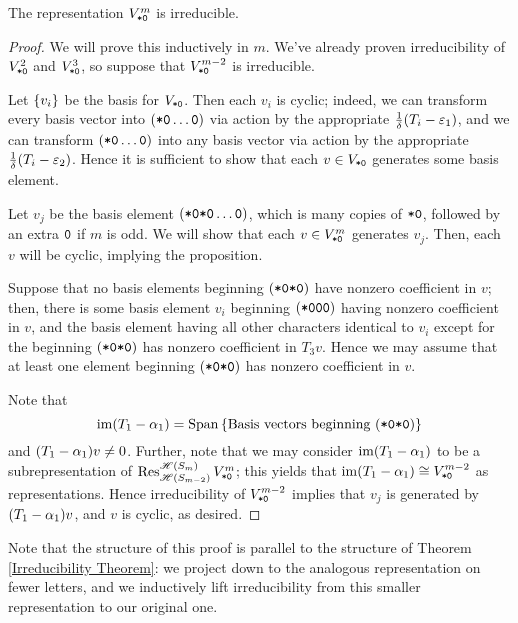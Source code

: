 \documentclass{amsart}
\begin{document}
\begin{proposition}\label{Fib irreducibility}
  The representation \emph{$V^m_{\texttt{*}\texttt{0}}$} is irreducible.
\end{proposition}
\begin{proof}
  We will prove this inductively in $m$.
  We've already proven irreducibility of $V^2_{\texttt{*}\texttt{0}}$ and $V^3_{\texttt{*}\texttt{0}}$, so suppose that $V^{m-2}_{\texttt{*}\texttt{0}}$ is irreducible.
  
  Let $\left\{ v_i \right\}$ be the basis for $V_{\texttt{*}\texttt{0}}$.
  Then each $v_i$ is cyclic; indeed, we can transform every basis vector into $(\texttt{*}\texttt{0} \dots \texttt{0})$ via action by the appropriate $\frac{1}{\delta}(T_i - \varepsilon_1)$, and we can transform $(\texttt{*}\texttt{0} \dots \texttt{0})$ into any basis vector via action by the appropriate $\frac{1}{\delta}(T_i - \varepsilon_2)$.
  Hence it is sufficient to show that each $v \in V_{\texttt{*}\texttt{0}}$ generates some basis element.

  Let $v_j$ be the basis element $(\texttt{*}\texttt{0}\texttt{*}\texttt{0}\dots \texttt{0})$, which is many copies of $\texttt{*}\texttt{0}$, followed by an extra $\texttt{0}$ if $m$ is odd.
  We will show that each $v \in V^m_{\texttt{*}\texttt{0}}$ generates $v_j$.
  Then, each $v$ will be cyclic, implying the proposition.

  Suppose that no basis elements beginning $(\texttt{*}\texttt{0}\texttt{*}\texttt{0})$ have nonzero coefficient in $v$;
  then, there is some basis element $v_i$ beginning $(\texttt{*}\texttt{0}\texttt{0}\texttt{0})$ having nonzero coefficient in $v$, and the basis element having all other characters identical to $v_i$ except for the beginning $(\texttt{*}\texttt{0}\texttt{*}\texttt{0})$ has nonzero coefficient in $T_3v$.
  Hence we may assume that at least one element beginning $(\texttt{*}\texttt{0}\texttt{*}\texttt{0})$ has nonzero coefficient in $v$.

  Note that \[\operatorname{im} (T_1 - \alpha_1) = \operatorname{Span}\left\{ \text{Basis vectors beginning }(\texttt{*}\texttt{0}\texttt{*}\texttt{0}) \right\}\] and $(T_1 - \alpha_1)v \neq 0$.
  Further, note that we may consider $\operatorname{im} (T_1 - \alpha_1)$ to be a subrepresentation of $\operatorname{Res}_{\mathscr{H}(S_{m-2})}^{\mathscr{H}(S_m)} V^m_{\texttt{*}\texttt{0}}$;
  this yields that $\operatorname{im} (T_1 - \alpha_1) \cong V^{m-2}_{\texttt{*}\texttt{0}}$ as representations.
  Hence irreducibility of $V^{m-2}_{\texttt{*}\texttt{0}}$ implies that $v_j$ is generated by $(T_1 - \alpha_1)v$, and $v$ is cyclic, as desired.
\end{proof}

Note that the structure of this proof is parallel to the structure of Theorem \ref{Irreducibility Theorem}:
we project down to the analogous representation on fewer letters, and we inductively lift irreducibility from this smaller representation to our original one.
\end{document}
